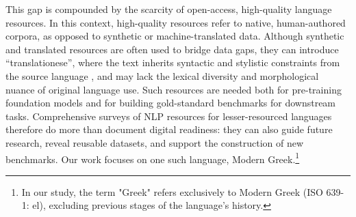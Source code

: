 \documentclass[sigconf,review,anonymous]{acmart}
\begin{document}
This gap is compounded by the scarcity of open-access, high-quality language resources. In this context, high-quality resources refer to native, human-authored corpora, as opposed to synthetic or machine-translated data. Although synthetic and translated resources are often used to bridge data gaps, they can introduce ``translationese'', where the text inherits syntactic and stylistic constraints from the source language \cite{koppel2011translationese}, and may lack the lexical diversity and morphological nuance of original language use. Such resources are needed both for pre-training foundation models and for building gold-standard benchmarks for downstream tasks. Comprehensive surveys of NLP resources for lesser-resourced languages therefore do more than document digital readiness: they can also guide future research, reveal reusable datasets, and support the construction of new benchmarks. Our work focuses on one such language, Modern Greek.\footnote{In our study, the term "Greek" refers exclusively to Modern Greek (ISO 639-1: el), excluding previous stages of the language's history.}
\end{document}
